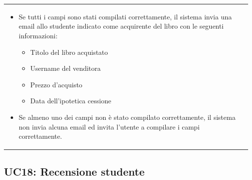 \documentclass[10pt,a4paper]{article}
\begin{document}
\begin{tabular}{lp{}}
\begin{enumerate}
			\begin{itemize}
				\item Se tutti i campi sono stati compilati correttamente, il sistema invia una email allo studente indicato come acquirente del libro con le seguenti informazioni:
				\begin{itemize}
					\item Titolo del libro acquistato
					\item Username del venditora
					\item Prezzo d'acquisto
					\item Data dell'ipotetica cessione
				\end{itemize}
				\item Se almeno uno dei campi non è stato compilato correttamente, il sistema non invia alcuna email ed invita l'utente a compilare i campi correttamente.
			\end{itemize}
		\end{enumerate}
	\end{tabular}

	\subsection{UC18: Recensione studente}
\end{document}
